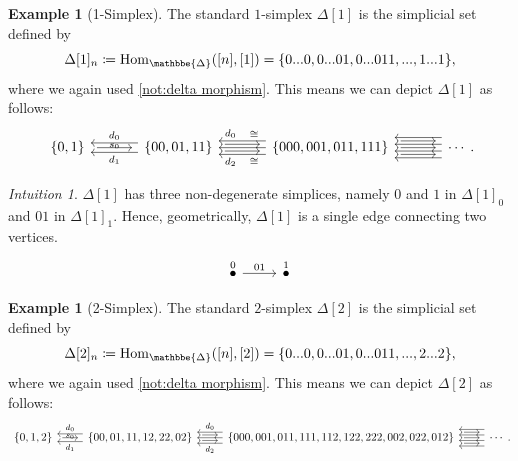 \documentclass[11pt, a4paper]{amsart}
\def\DDelta{{\mathbbe{\Delta}}}
\newcommand{\DD}{\DDelta}
\newcommand{\Hom}{\mathrm{Hom}}
\theoremstyle{definition}
\newtheorem{example}[equation]{Example}
\theoremstyle{remark}
\newtheorem{intuition}[equation]{Intuition}
\numberwithin{equation}{section}
\begin{document}
\begin{example}[1-Simplex]
  The standard $1$-simplex $\Delta[1]$ is the simplicial set defined by 
  \[\Delta[1]_n \coloneq \Hom_{\DD}([n],[1]) = \{0...0, 0...01, 0...011,..., 1...1\},\] 
  where we again used \cref{not:delta morphism}. This means we can depict $\Delta[1]$ as follows:
  \[
  \begin{tikzcd}[column sep=1.2cm]
   \{0,1\} \arrow[r, shorten >=1ex,shorten <=1ex, "s_0"'  yshift= .2cm]
   & \{00,01,11\} 
   \arrow[l, shift left=1.4, "d_1"] \arrow[l, shift right=1.4, "d_0"'] 
   \arrow[r, shift right, shorten >=1ex,shorten <=1ex ] \arrow[r, shift left, shorten >=1ex,shorten <=1ex] 
   & \{000,001,011,111\} 
   \arrow[l] \arrow[l, shift left=2, "d_2" near end, "\cong" near start] \arrow[l, shift right=2, "d_0"' near end, "\cong"' near start] 
   \arrow[r, shorten >=1ex,shorten <=1ex] \arrow[r, shift left=2, shorten >=1ex,shorten <=1ex] 
   \arrow[r, shift right=2, shorten >=1ex,shorten <=1ex]
   & \cdots 
   \arrow[l, shift right=1] \arrow[l, shift left=1] \arrow[l, shift right=3] \arrow[l, shift left=3] 
 \end{tikzcd}.
  \]
\end{example}

\begin{intuition}
  $\Delta[1]$ has three non-degenerate simplices, namely $0$ and $1$ in $\Delta[1]_0$ and $01$ in $\Delta[1]_1$. Hence, geometrically, $\Delta[1]$ is a single edge connecting two vertices.
  \[ 
  \begin{tikzcd} 
    \overset{0}{\bullet} \arrow[r, "01"] & \overset{1}{\bullet}
  \end{tikzcd}
  \]
\end{intuition}

\begin{example}[2-Simplex]
  The standard $2$-simplex $\Delta[2]$ is the simplicial set defined by 
  \[\Delta[2]_n \coloneq \Hom_{\DD}([n],[2]) = \{0...0, 0...01, 0...011,..., 2...2\},\] 
  where we again used \cref{not:delta morphism}. This means we can depict $\Delta[2]$ as follows:
  {\small
  \[
  \begin{tikzcd}[column sep=0.8cm]
   \{0,1,2\} \arrow[r, shorten >=1ex,shorten <=1ex, "s_0"'  yshift= .2cm]
   & \{00,01,11,12,22,02\} 
   \arrow[l, shift left=1.4, "d_1"] \arrow[l, shift right=1.4, "d_0"'] 
   \arrow[r, shift right, shorten >=1ex,shorten <=1ex ] \arrow[r, shift left, shorten >=1ex,shorten <=1ex] 
   & \{000,001,011,111,112,122,222,002,022,012\} 
   \arrow[l] \arrow[l, shift left=2, "d_2"] \arrow[l, shift right=2, "d_0"'] 
   \arrow[r, shorten >=1ex,shorten <=1ex] \arrow[r, shift left=2, shorten >=1ex,shorten <=1ex] 
   \arrow[r, shift right=2, shorten >=1ex,shorten <=1ex]
   & \cdots 
   \arrow[l, shift right=1] \arrow[l, shift left=1] \arrow[l, shift right=3] \arrow[l, shift left=3] 
 \end{tikzcd}.
  \]
  }
\end{example}
\end{document}
